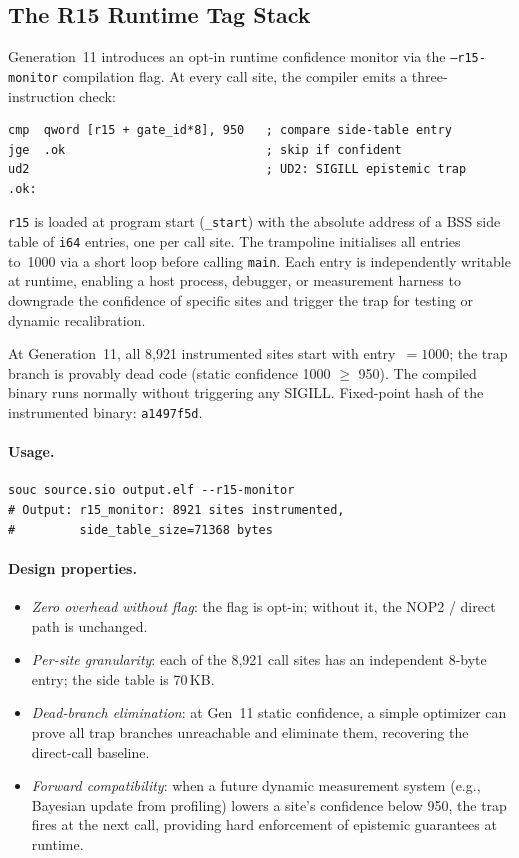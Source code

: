 \documentclass[acmsmall,screen,review,anonymous]{acmart}
\begin{document}
\subsection{The R15 Runtime Tag Stack}
\label{sec:r15}

Generation~11 introduces an opt-in runtime confidence monitor via
the \texttt{--r15-monitor} compilation flag.
At every call site, the compiler emits a three-instruction check:

\begin{verbatim}
cmp  qword [r15 + gate_id*8], 950   ; compare side-table entry
jge  .ok                            ; skip if confident
ud2                                 ; UD2: SIGILL epistemic trap
.ok:
\end{verbatim}

\noindent
\texttt{r15} is loaded at program start (\texttt{\_start}) with the
absolute address of a BSS side table of \texttt{i64} entries, one per
call site.
The trampoline initialises all entries to~1000 via a short loop before
calling \texttt{main}.
Each entry is independently writable at runtime, enabling a host
process, debugger, or measurement harness to downgrade the confidence of
specific sites and trigger the trap for testing or dynamic recalibration.

At Generation~11, all 8,921 instrumented sites start with entry~$=1000$;
the trap branch is provably dead code (static confidence 1000 $\geq$ 950).
The compiled binary runs normally without triggering any SIGILL.
Fixed-point hash of the instrumented binary: \texttt{a1497f5d}.

\paragraph{Usage.}
\begin{verbatim}
souc source.sio output.elf --r15-monitor
# Output: r15_monitor: 8921 sites instrumented,
#         side_table_size=71368 bytes
\end{verbatim}

\paragraph{Design properties.}
\begin{itemize}
\item \emph{Zero overhead without flag}: the flag is opt-in;
  without it, the NOP2 / direct path is unchanged.
\item \emph{Per-site granularity}: each of the 8,921 call sites
  has an independent 8-byte entry; the side table is 70\,KB.
\item \emph{Dead-branch elimination}: at Gen~11 static confidence,
  a simple optimizer can prove all trap branches unreachable and
  eliminate them, recovering the direct-call baseline.
\item \emph{Forward compatibility}: when a future dynamic measurement
  system (e.g., Bayesian update from profiling) lowers a site's confidence
  below 950, the trap fires at the next call, providing hard enforcement
  of epistemic guarantees at runtime.
\end{itemize}
\end{document}
